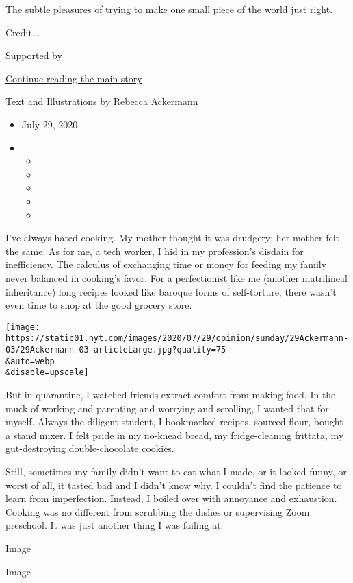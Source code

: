 The subtle pleasures of trying to make one small piece of the world just
right.

Credit...

Supported by

\protect\hyperlink{after-sponsor}{Continue reading the main story}

Text and Illustrations by Rebecca Ackermann

\begin{itemize}
\item
  July 29, 2020
\item
  \begin{itemize}
  \item
  \item
  \item
  \item
  \item
  \end{itemize}
\end{itemize}

I've always hated cooking. My mother thought it was drudgery; her mother
felt the same. As for me, a tech worker, I hid in my profession's
disdain for inefficiency. The calculus of exchanging time or money for
feeding my family never balanced in cooking's favor. For a perfectionist
like me (another matrilineal inheritance) long recipes looked like
baroque forms of self-torture; there wasn't even time to shop at the
good grocery store.

\texttt{[image: https://static01.nyt.com/images/2020/07/29/opinion/sunday/29Ackermann-03/29Ackermann-03-articleLarge.jpg?quality=75\\\&auto=webp\\\&disable=upscale]}

But in quarantine, I watched friends extract comfort from making food.
In the muck of working and parenting and worrying and scrolling, I
wanted that for myself. Always the diligent student, I bookmarked
recipes, sourced flour, bought a stand mixer. I felt pride in my
no-knead bread, my fridge-cleaning frittata, my gut-destroying
double-chocolate cookies.

Still, sometimes my family didn't want to eat what I made, or it looked
funny, or worst of all, it tasted bad and I didn't know why. I couldn't
find the patience to learn from imperfection. Instead, I boiled over
with annoyance and exhaustion. Cooking was no different from scrubbing
the dishes or supervising Zoom preschool. It was just another thing I
was failing at.

Image

Image

